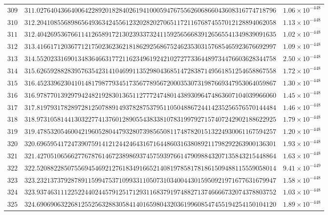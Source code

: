 \documentclass[12pt,reqno]{amsart}
\theoremstyle{remark}
\begin{document}
\begin{longtable}{clc}
$309$ & $311.0276404366400642289201828402619410005947675562606866043608316774718796$ & $1.06\times 10^{-448}$ \\
$310$ & $312.2041085568986564936342455612320282027065117211676874557012128894062058$ & $1.13\times 10^{-448}$ \\
$311$ & $312.4042695367661141265891721302393373241159256566839126565541349839091635$ & $1.02\times 10^{-448}$ \\
$312$ & $313.4166171203677121750236236218186292568675246235303157685465923676692997$ & $1.09\times 10^{-448}$ \\
$313$ & $314.5520233169013483646631772116234961924210272773364489734476603628344758$ & $2.50\times 10^{-448}$ \\
$314$ & $315.6265928828395763542314104699113529804368514728387149561851254658867558$ & $1.72\times 10^{-448}$ \\
$315$ & $316.4523396230410148179877934517356778956720003530731987669347953064059867$ & $1.30\times 10^{-448}$ \\
$316$ & $316.9787701392979424821928301365112777247480143893096474863607104039966060$ & $1.45\times 10^{-448}$ \\
$317$ & $317.8197931782897281250788914937828753795110504886724414235256576570144484$ & $1.46\times 10^{-448}$ \\
$318$ & $318.9731058144130322774137601289055438338107831997927157407242902188622925$ & $1.79\times 10^{-448}$ \\
$319$ & $319.4785320546004219605280447932807398565081174878201513224930061167594257$ & $1.20\times 10^{-448}$ \\
$320$ & $320.6965954172473907591412124424643167164486031638089211798292263900136301$ & $1.93\times 10^{-448}$ \\
$321$ & $321.4270510656627767876146723898693745759397661479098843207135843215448864$ & $1.63\times 10^{-448}$ \\
$322$ & $322.5208822850755694546921276183491665214081978581781861509488115559058014$ & $9.41\times 10^{-449}$ \\
$323$ & $323.2321373792878911599475371099331105073103400443015950921971677631679947$ & $1.58\times 10^{-448}$ \\
$324$ & $323.9374631112252244024457912517129311683791974882713746666732074378803752$ & $1.03\times 10^{-448}$ \\
$325$ & $324.6906906322681255256328830584140165980432036199608547455194254150104120$ & $1.89\times 10^{-448}$ \\

\end{longtable}
\end{document}
